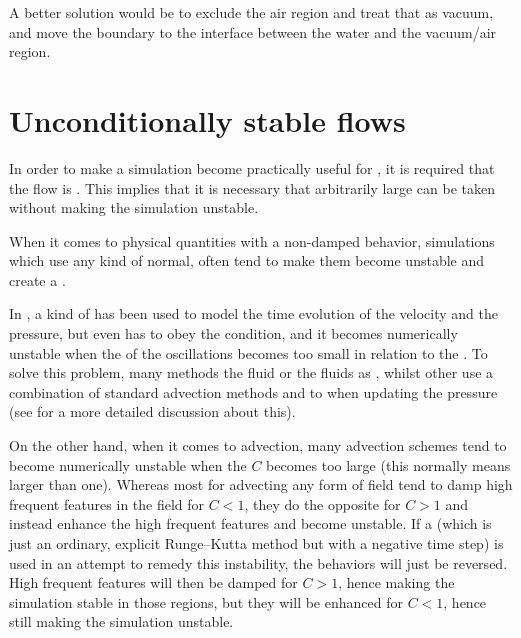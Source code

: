 A better solution would be to exclude the air region and treat that as vacuum, and move the boundary to the interface between the water and the vacuum/air region.

\section{Unconditionally stable flows}

In order to make a \FVM simulation become practically useful for , it is required that the flow is . This implies that it is necessary that arbitrarily large \timesteps can be taken without making the simulation unstable.

When it comes to physical quantities with a non-damped \oscillating behavior, simulations which use any kind of normal,  often tend to make them become unstable and create a .

In \thisprojectwork, a kind of  has been used to model the time evolution of the velocity and the pressure, but even  has to obey the \CFL condition, and it becomes numerically unstable when the \period of the oscillations becomes too small in relation to the \timestep. To solve this problem, many methods \approximate the fluid or the fluids as \incompressible, whilst other use a combination of standard advection methods and  to when updating the pressure (see 
 for a more detailed discussion about this).

On the other hand, when it comes to advection, many advection schemes tend to become numerically unstable when the  $C$ becomes too large (this normally means larger than one). Whereas most  for advecting any form of field tend to damp high frequent features in the field for $C < 1$, they do the opposite for $C > 1$ and instead enhance the high frequent features and become unstable. If a  (which is just an ordinary, explicit Runge--Kutta method but with a negative time step) is used in an attempt to remedy this instability, the behaviors will just be reversed. High frequent features will then be damped for $C > 1$, hence making the simulation stable in those regions, but they will be enhanced for $C < 1$, hence still making the simulation unstable.

